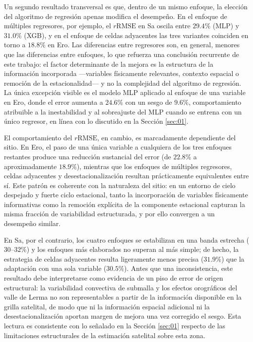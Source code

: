 Un segundo resultado transversal es que, dentro de un mismo enfoque, la elección del algoritmo de regresión apenas modifica el desempeño. En el enfoque de múltiples regresores, por ejemplo, el $r\mathrm{RMSE}$ en Sa oscila entre $29.4\%$ (MLP) y $31.0\%$ (XGB), y en el enfoque de celdas adyacentes las tres variantes coinciden en torno a $18.8\%$ en Ero. Las diferencias entre regresores son, en general, menores que las diferencias entre enfoques, lo que refuerza una conclusión recurrente de este trabajo: el factor determinante de la mejora es la estructura de la información incorporada —variables físicamente relevantes, contexto espacial o remoción de la estacionalidad— y no la complejidad del algoritmo de regresión. La única excepción visible es el modelo MLP aplicado al enfoque de una variable en Ero, donde el error aumenta a $24.6\%$ con un sesgo de $9.6\%$, comportamiento atribuible a la inestabilidad y al sobreajuste del MLP cuando se entrena con un único regresor, en línea con lo discutido en la Sección \ref{sec:01}.


El comportamiento del $r\mathrm{RMSE}$, en cambio, es marcadamente dependiente del sitio. En Ero, el paso de una única variable a cualquiera de los tres enfoques restantes produce una reducción sustancial del error (de $22.8\%$ a aproximadamente $18.9\%$), mientras que los enfoques de múltiples regresores, celdas adyacentes y desestacionalización resultan prácticamente equivalentes entre sí. Este patrón es coherente con la naturaleza del sitio: en un entorno de cielo despejado y fuerte ciclo estacional, tanto la incorporación de variables físicamente informativas como la remoción explícita de la componente estacional capturan la misma fracción de variabilidad estructurada, y por ello convergen a un desempeño similar.


En Sa, por el contrario, los cuatro enfoques se estabilizan en una banda estrecha ($30$–$32\%$) y los enfoques más elaborados no superan al más simple; de hecho, la estrategia de celdas adyacentes resulta ligeramente menos precisa ($31.9\%$) que la adaptación con una sola variable ($30.5\%$). Antes que una inconsistencia, este resultado debe interpretarse como evidencia de un piso de error de origen estructural: la variabilidad convectiva de submalla y los efectos orográficos del valle de Lerma no son representables a partir de la información disponible en la grilla satelital, de modo que ni la información espacial adicional ni la desestacionalización aportan margen de mejora una vez corregido el sesgo. Esta lectura es consistente con lo señalado en la Sección \ref{sec:01} respecto de las limitaciones estructurales de la estimación satelital sobre esta zona.


